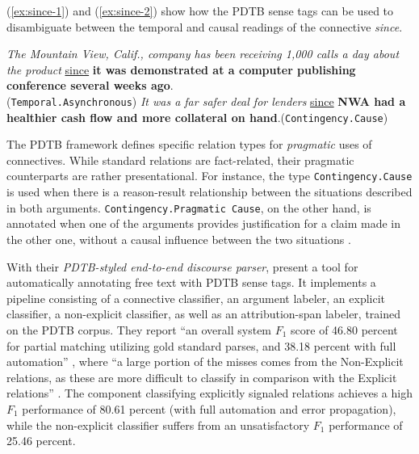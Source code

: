 \documentclass[
    a4paper,%
    12pt,%
    oneside,%
    toc=bibliography,
    final,
]{scrartcl}
\begin{document}
(\ref{ex:since-1}) and (\ref{ex:since-2}) \citep[from][4]{Prasad2008} show how the PDTB sense tags can be used to disambiguate between the temporal and causal readings of the connective \textit{since}.

\begin{exe}
\ex \label{ex:since-1} \textit{The Mountain View, Calif., company has been receiving 1,000 calls a day about the product} \underline{since} \textbf{it was demonstrated at a computer publishing conference several weeks ago}.\\
\hspace*{\fill}(\lstinline|Temporal.Asynchronous|)
\ex \label{ex:since-2} \textit{It was a far safer deal for lenders} \underline{since} \textbf{NWA had a healthier cash flow and more collateral on hand}.\hspace*{\fill}(\lstinline|Contingency.Cause|)
\end{exe}

The PDTB framework defines specific relation types for \textit{pragmatic} uses of connectives. While standard relations are fact-related, their pragmatic counterparts are rather presentational. For instance, the type \lstinline|Contingency.Cause| is used when there is a reason-result relationship between the situations described in both arguments. \lstinline|Contingency.Pragmatic Cause|, on the other hand, is annotated when one of the arguments provides justification for a claim made in the other one, without a causal influence between the two situations \citep[see][29]{Prasad2007}.

With their \textit{PDTB-styled end-to-end discourse parser}, \citet{Lin2014} present a tool for automatically annotating free text with PDTB sense tags. It implements a pipeline consisting of a connective classifier, an argument labeler, an explicit classifier, a non-explicit classifier, as well as an attribution-span labeler, trained on the PDTB corpus. They report “an overall system $ F_1 $ score of 46.80 percent for partial matching utilizing gold standard parses, and 38.18 percent with full automation” \citep[152]{Lin2014}, where “a large portion of the misses comes from the Non-Explicit relations, as these are more difficult to classify in comparison with the Explicit relations”  \citep[177]{Lin2014}. The component classifying explicitly signaled relations achieves a high $ F_1 $ performance of 80.61 percent (with full automation and error propagation), while the non-explicit classifier suffers from an unsatisfactory $ F_1 $ performance of 25.46 percent.
\end{document}
